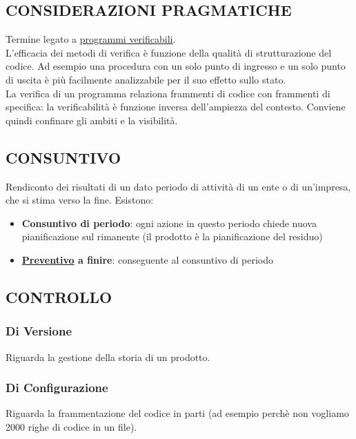 		\subsection{CONSIDERAZIONI PRAGMATICHE} 	\label{pragmatico}
		Termine legato a \underline{\hyperref[programmiverificabili]{programmi verificabili}}. \\
		L’efficacia dei metodi di verifica è funzione della qualità di strutturazione del codice. Ad esempio una procedura con un solo punto di ingresso e un solo punto di uscita è più facilmente analizzabile per il suo effetto sullo stato. \\
		La verifica di un programma relaziona frammenti di codice con frammenti di specifica: la verificabilità è funzione inversa dell’ampiezza del contesto. Conviene quindi confinare gli ambiti e la visibilità.


		\subsection{CONSUNTIVO}  \label{consuntivo}
		Rendiconto dei risultati di un dato periodo di attività di un ente o di un'impresa, che si stima verso la fine.
		Esistono:
			\begin{itemize}
				\item \textbf{Consuntivo di periodo}: ogni azione in questo periodo chiede nuova pianificazione sul rimanente (il prodotto è la pianificazione del residuo)
				\item \textbf{\underline{\hyperref[preventivo]{Preventivo}} a finire}: conseguente al consuntivo di periodo
			\end{itemize}


		\subsection{CONTROLLO}  \label{controllo}
			\subsubsection{Di Versione}  \label{controllodiversione} 
			Riguarda la gestione della storia di un prodotto.
			\subsubsection{Di Configurazione}  \label{controllodiconfigurazione} 
			Riguarda la frammentazione del codice in parti (ad esempio perchè non vogliamo 2000 righe di codice in un file).


